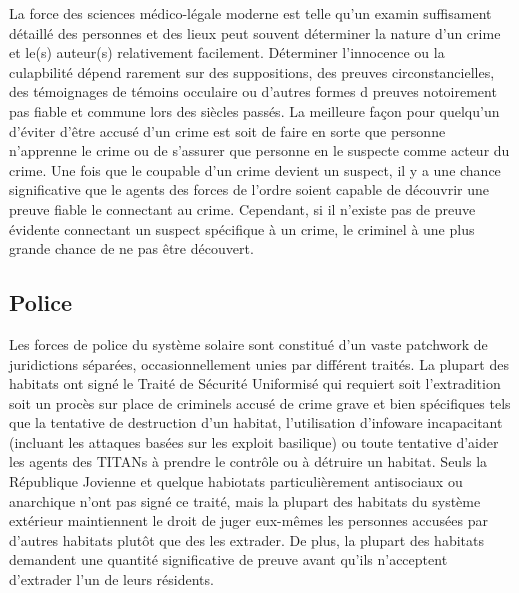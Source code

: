 La force des sciences médico-légale moderne est telle qu'un examin suffisament détaillé des personnes et des lieux peut souvent déterminer la nature d'un crime et le(s) auteur(s) relativement facilement. Déterminer l'innocence ou la culapbilité dépend rarement sur des suppositions, des preuves circonstancielles, des témoignages de témoins occulaire ou d'autres formes d preuves notoirement pas fiable et commune lors des siècles passés. La meilleure façon pour quelqu'un d'éviter d'être accusé d'un crime est soit de faire en sorte que personne n'apprenne le crime ou de s'assurer que personne en le suspecte comme acteur du crime. Une fois que le coupable d'un crime devient un suspect, il y a une chance significative que le agents des forces de l'ordre soient capable de découvrir une preuve fiable le connectant au crime. Cependant, si il n'existe pas de preuve évidente connectant un suspect spécifique à un crime, le criminel à une plus grande chance de ne pas être découvert. 

\subsection{Police} \label{sec:law-enforcement} 

Les forces de police du système solaire sont constitué d'un vaste patchwork de juridictions séparées, occasionnellement unies par différent traités. La plupart des habitats ont signé le Traité de Sécurité Uniformisé qui requiert soit l'extradition soit un procès sur place de criminels accusé de crime grave et bien spécifiques tels que la tentative de destruction d'un habitat, l'utilisation d'infoware incapacitant (incluant les attaques basées sur les exploit basilique) ou toute tentative d'aider les agents des TITANs à prendre le contrôle ou à détruire un habitat. Seuls la République Jovienne et quelque habiotats particulièrement antisociaux ou anarchique n'ont pas signé ce traité, mais la plupart des habitats du système extérieur maintiennent le droit de juger eux-mêmes les personnes accusées par d'autres habitats plutôt que des les extrader. De plus, la plupart des habitats demandent une quantité significative de preuve avant qu'ils n'acceptent d'extrader l'un de leurs résidents. 

